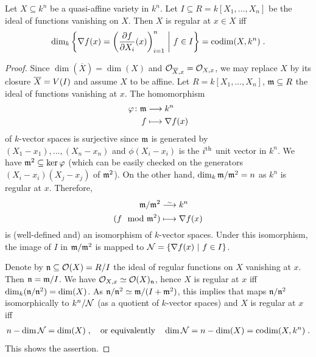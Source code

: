 \documentclass[a4paper,parskip=half,numbers=enddot, DIV=12]{scrreprt}
\begin{document}
\begin{prop}
    Let $X\subseteq k^n$ be  a quasi-affine variety in $k^n$. Let $I\subseteq R=k[X_1,\ldots,X_n]$ be the ideal of functions vanishing on $X$. Then $X$ is regular at $x\in X$ iff 
    \begin{align*}
        \dim_k \left\{\nabla f(x) = \left(\frac{\partial f}{\partial X_i}(x)\right)_{i=1}^n \ \middle|\  f\in I\right\} = \operatorname{codim}(X,k^n)\;.
    \end{align*}
\end{prop}
\begin{proof}
    Since $\dim (\overline{X}) = \dim (X)$ and $\mathcal{O}_{\overline{X},x} = \mathcal{O}_{X,x}$, we may replace $X$ by its closure $\overline{X}=V(I)$ and assume $X$ to be affine. Let $R=k[X_1,\ldots,X_n]$, $\mathfrak{m}\subseteq R$ the ideal of functions vanishing at $x$. The homomorphism
    \begin{align*}
    	\phi\colon\mm&\morphism k^n\\
    	f&\longmapsto\nabla f(x)
    \end{align*}
    of $k$-vector spaces is surjective since $\mathfrak{m}$ is generated by $(X_1-x_1),\ldots,(X_n-x_n)$ and $\phi(X_i-x_i)$ is the $i^{\text{th}}$ unit vector in $k^n$. We have $\mathfrak{m}^2\subseteq\ker\varphi$ (which can be easily checked on the generators $(X_i-x_i)(X_j-x_j)$ of $\mathfrak{m}^2$). On the other hand, $\dim_k\mathfrak{m}/\mathfrak{m}^2=n$ as $k^n$ is regular at $x$. Therefore,
    \begin{align}\lbl{eq:modToNabla}
	    \begin{split}
		    \mm/\mm^2 &\isomorphism k^n\\
		    (f\mod \mm^2)&\longmapsto \nabla f(x)
	    \end{split}
    \end{align}
    is (well-defined and) an isomorphism of $k$-vector spaces. Under this isomorphism, the image of $I$ in $\mathfrak{m}/\mathfrak{m}^2$ is mapped to $\mathcal{N}=\left\{\nabla f(x) \ \middle|\  f\in I\right\}$.
    
     Denote by $\mathfrak{n}\subseteq \mathcal{O}(X)=R/I$ the ideal of regular functions on $X$ vanishing at $x$. Then $\mathfrak{n} = \mathfrak{m}/I$. We have $\mathcal{O}_{X,x} \simeq \mathcal{O}(X)_{\mathfrak{n}}$, hence $X$ is regular at $x$ iff $\dim_k(\mathfrak{n}/\mathfrak{n}^2) = \dim (X)$. As $\mathfrak{n}/\mathfrak{n}^2\simeq \mathfrak{m}/(I+\mathfrak{m}^2)$, this implies that  maps $\mathfrak{n}/\mathfrak{n}^2$ isomorphically to $k^n/\mathcal{N}$ (as a quotient of $k$-vector spaces) and $X$ is regular at $x$ iff 
     \begin{align*}
     	n-\dim\mathcal{N} = \dim (X)\;,\quad\text{or equivalently}\quad\dim \mathcal{N} =n-\dim (X) = \operatorname{codim}(X,k^n)\;.
     \end{align*}
     This shows the assertion.
\end{proof}
\end{document}
